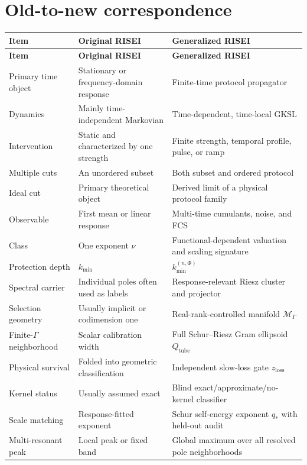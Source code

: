 \documentclass[11pt]{article}
\theoremstyle{definition}
\theoremstyle{remark}
\newcommand{\PhiF}{\Phi}
\newcommand{\cM}{\mathcal M}
\begin{document}
\section{Old-to-new correspondence}

\begin{longtable}{>{\raggedright\arraybackslash}p{} >{\raggedright\arraybackslash}p{} >{\raggedright\arraybackslash}p{}}
\toprule
\textbf{Item} & \textbf{Original RISEI} & \textbf{Generalized RISEI}\\
\midrule
\endfirsthead
\toprule
\textbf{Item} & \textbf{Original RISEI} & \textbf{Generalized RISEI}\\
\midrule
\endhead
Primary time object & Stationary or frequency-domain response & Finite-time protocol propagator\\
Dynamics & Mainly time-independent Markovian & Time-dependent, time-local GKSL\\
Intervention & Static and characterized by one strength & Finite strength, temporal profile, pulse, or ramp\\
Multiple cuts & An unordered subset & Both subset and ordered protocol\\
Ideal cut & Primary theoretical object & Derived limit of a physical protocol family\\
Observable & First mean or linear response & Multi-time cumulants, noise, and FCS\\
Class & One exponent $\nu$ & Functional-dependent valuation and scaling signature\\
Protection depth & $k_{\min}$ & $k_{\min}^{(n,\PhiF)}$\\
Spectral carrier & Individual poles often used as labels & Response-relevant Riesz cluster and projector\\
Selection geometry & Usually implicit or codimension one & Real-rank-controlled manifold $\cM_\Gamma$\\
Finite-$\Gamma$ neighborhood & Scalar calibration width & Full Schur--Riesz Gram ellipsoid $Q_{\mathrm{tube}}$\\
Physical survival & Folded into geometric classification & Independent slow-loss gate $z_{\mathrm{loss}}$\\
Kernel status & Usually assumed exact & Blind exact/approximate/no-kernel classifier\\
Scale matching & Response-fitted exponent & Schur self-energy exponent $q_*$ with held-out audit\\
Multi-resonant peak & Local peak or fixed band & Global maximum over all resolved pole neighborhoods\\

\end{longtable}
\end{document}
